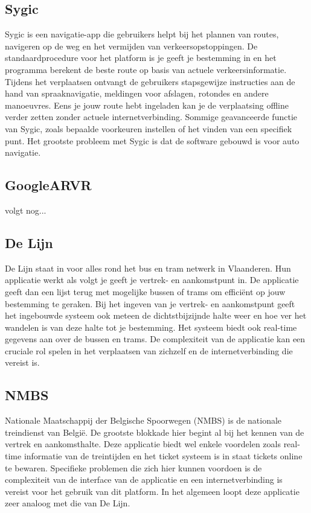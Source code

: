 \subsection{Sygic}
\label{sec:sygic}
Sygic is een navigatie-app die gebruikers helpt bij het plannen van routes, navigeren op de weg en het vermijden van verkeersopstoppingen. De standaardprocedure voor het platform is je geeft je bestemming in en het programma berekent de beste route op basis van actuele verkeersinformatie. Tijdens het verplaatsen ontvangt de gebruikers stapsgewijze instructies aan de hand van spraaknavigatie, meldingen voor afslagen, rotondes en andere manoeuvres. Eens je jouw route hebt ingeladen kan je de verplaatsing offline verder zetten zonder actuele internetverbinding. Sommige geavanceerde functie van Sygic, zoals bepaalde voorkeuren instellen of het vinden van een specifiek punt. Het grootste probleem met Sygic is dat de software gebouwd is voor auto navigatie.
\subsection{GoogleARVR}
\label{sec:googlearvr}
volgt nog...
\subsection{De Lijn}
\label{sec:delijn}
De Lijn staat in voor alles rond het bus en tram netwerk in Vlaanderen. Hun applicatie werkt als volgt je geeft je vertrek- en aankomstpunt in. De applicatie geeft dan een lijst terug met mogelijke bussen of trams om efficiënt op jouw bestemming te geraken. Bij het ingeven van je vertrek- en aankomstpunt geeft het ingebouwde systeem ook meteen de dichtstbijzijnde halte weer en hoe ver het wandelen is van deze halte tot je bestemming. Het systeem biedt ook real-time gegevens aan over de bussen en trams. De complexiteit van de applicatie kan een cruciale rol spelen in het verplaatsen van zichzelf en de internetverbinding die vereist is.
\subsection{NMBS}
\label{sec:nmbs}
Nationale Maatschappij der Belgische Spoorwegen (NMBS) is de nationale treindienst van België. De grootste blokkade hier begint al bij het kennen van de vertrek en aankomsthalte. Deze applicatie biedt wel enkele voordelen zoals real-time informatie van de treintijden en het ticket systeem is in staat tickets online te bewaren. Specifieke problemen die zich hier kunnen voordoen is de complexiteit van de interface van de applicatie en een internetverbinding is vereist voor het gebruik van dit platform. In het algemeen loopt deze applicatie zeer analoog met die van De Lijn.
